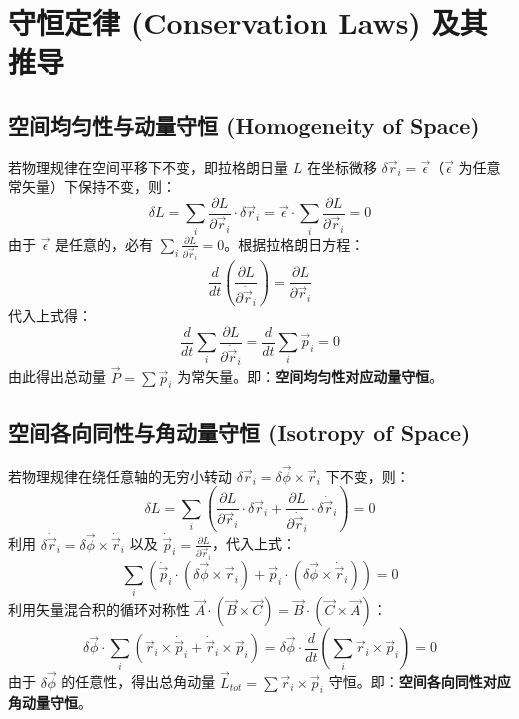 \documentclass[11pt,a4paper]{article}
\begin{document}
\section{守恒定律 (Conservation Laws) 及其推导}

\subsection{空间均匀性与动量守恒 (Homogeneity of Space)}
若物理规律在空间平移下不变，即拉格朗日量 $L$ 在坐标微移 $\delta \vec{r}_i = \vec{\epsilon}$（$\vec{\epsilon}$ 为任意常矢量）下保持不变，则：
\[ \delta L = \sum_i \frac{\partial L}{\partial \vec{r}_i} \cdot \delta \vec{r}_i = \vec{\epsilon} \cdot \sum_i \frac{\partial L}{\partial \vec{r}_i} = 0 \]
由于 $\vec{\epsilon}$ 是任意的，必有 $\sum_i \frac{\partial L}{\partial \vec{r}_i} = 0$。根据拉格朗日方程：
\[ \frac{d}{dt} \left( \frac{\partial L}{\partial \dot{\vec{r}}_i} \right) = \frac{\partial L}{\partial \vec{r}_i} \]
代入上式得：
\[ \frac{d}{dt} \sum_i \frac{\partial L}{\partial \dot{\vec{r}}_i} = \frac{d}{dt} \sum_i \vec{p}_i = 0 \]
由此得出总动量 $\vec{P} = \sum \vec{p}_i$ 为常矢量。即：\textbf{空间均匀性对应动量守恒}。

\subsection{空间各向同性与角动量守恒 (Isotropy of Space)}
若物理规律在绕任意轴的无穷小转动 $\delta \vec{r}_i = \delta \vec{\phi} \times \vec{r}_i$ 下不变，则：
\[ \delta L = \sum_i \left( \frac{\partial L}{\partial \vec{r}_i} \cdot \delta \vec{r}_i + \frac{\partial L}{\partial \dot{\vec{r}}_i} \cdot \delta \dot{\vec{r}}_i \right) = 0 \]
利用 $\delta \dot{\vec{r}}_i = \delta \vec{\phi} \times \dot{\vec{r}}_i$ 以及 $\dot{\vec{p}}_i = \frac{\partial L}{\partial \vec{r}_i}$，代入上式：
\[ \sum_i \left( \dot{\vec{p}}_i \cdot (\delta \vec{\phi} \times \vec{r}_i) + \vec{p}_i \cdot (\delta \vec{\phi} \times \dot{\vec{r}}_i) \right) = 0 \]
利用矢量混合积的循环对称性 $\vec{A} \cdot (\vec{B} \times \vec{C}) = \vec{B} \cdot (\vec{C} \times \vec{A})$：
\[ \delta \vec{\phi} \cdot \sum_i \left( \vec{r}_i \times \dot{\vec{p}}_i + \dot{\vec{r}}_i \times \vec{p}_i \right) = \delta \vec{\phi} \cdot \frac{d}{dt} \left( \sum_i \vec{r}_i \times \vec{p}_i \right) = 0 \]
由于 $\delta \vec{\phi}$ 的任意性，得出总角动量 $\vec{L}_{tot} = \sum \vec{r}_i \times \vec{p}_i$ 守恒。即：\textbf{空间各向同性对应角动量守恒}。
\end{document}
